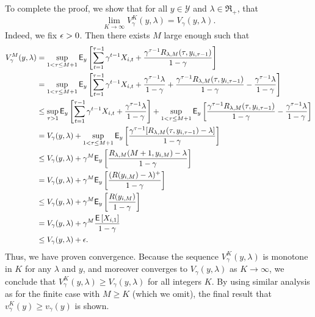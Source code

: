 \begin{myproof}[Proof.]
	To complete the proof, we show that for all $y \in \mathcal{Y}$ and $\lambda \in \Re_+$, that 
	\[
	\lim_{K \to \infty}V^K_\gamma(y, \lambda) = V_\gamma(y, \lambda).
	\]
	Indeed, we fix $\epsilon > 0$. Then there exists $M$ large enough such that
	\begin{align*}
		V^M_\gamma(y, \lambda) & = \sup_{1 < \tau \le M+1} \mathsf{E}_y\left[\sum_{t=1}^{\tau - 1} \gamma^{t-1} X_{i,t} + \frac{\gamma^{\tau-1}R_{\lambda,M}(\tau, y_{i,\tau-1})}{1-\gamma}\right] \\
		& = \sup_{1 < \tau \le M+1} \mathsf{E}_y\left[\sum_{t=1}^{\tau - 1} \gamma^{t-1} X_{i,t} + \frac{\gamma^{\tau -1}\lambda}{1-\gamma} + \frac{\gamma^{\tau-1}R_{\lambda,M}(\tau, y_{i,\tau-1})}{1-\gamma} - \frac{\gamma^{\tau -1}\lambda}{1-\gamma}\right] \\
		& \le \sup_{\tau > 1} \mathsf{E}_y\left[\sum_{t=1}^{\tau - 1} \gamma^{t-1} X_{i,t} + \frac{\gamma^{\tau -1}\lambda}{1-\gamma}\right] + \sup_{1 < \tau \le M + 1}\mathsf{E}_y\left[\frac{\gamma^{\tau-1}R_{\lambda,M}(\tau, y_{i,\tau-1})}{1-\gamma} - \frac{\gamma^{\tau -1}\lambda}{1-\gamma}\right] \\
		& =V_{\gamma}(y, \lambda) + \sup_{1 < \tau \le M + 1}\mathsf{E}_y\left[\frac{\gamma^{\tau-1}[R_{\lambda,M}(\tau, y_{i,\tau-1})-\lambda]}{1-\gamma}\right] \\
		& \le V_{\gamma}(y, \lambda)  + \gamma^{M}\mathsf{E}_y\left[\frac{R_{\lambda,M}(M+1, y_{i,M})-\lambda}{1-\gamma}\right] \\
		& = V_{\gamma}(y, \lambda)  + \gamma^{M}\mathsf{E}_y\left[\frac{( R(y_{i,M}) - \lambda)^+}{1-\gamma}\right] \\
		& \le V_{\gamma}(y, \lambda)  + \gamma^{M}\mathsf{E}_y\left[\frac{R(y_{i,M})}{1-\gamma}\right]  \\
		& = V_{\gamma}(y, \lambda)  + \gamma^M \frac{\mathsf{E} \left[ X_{i,1} \right]}{1-\gamma} \\
		& \le V_{\gamma}(y, \lambda)  + \epsilon.
	\end{align*}
	Thus, we have proven convergence. Because the sequence $V^K_\gamma(y, \lambda)$ is monotone in $K$ for any $\lambda$ and $y$, and moreover converges to $V_\gamma(y, \lambda)$ as $K \to \infty$, we conclude that $V^K_\gamma(y, \lambda) \ge V_\gamma(y, \lambda)$ for all integers $K$. By using similar analysis as for the finite case with $M \ge K$ (which we omit), the final result that $v^K_\gamma(y) \ge v_\gamma(y)$ is shown.
\end{myproof}


